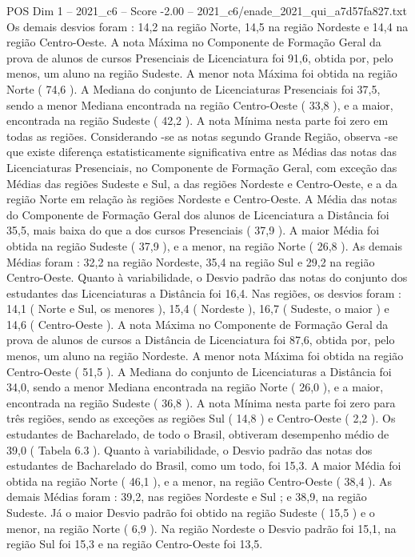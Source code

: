 \begin{textsample}{POS Dim 1 – 2021\_c6 – Score -2.00 – 2021\_c6/enade\_2021\_qui\_a7d57fa827.txt}
Os demais desvios foram : 14,2 na região Norte, 14,5 na região Nordeste e 14,4 na região Centro-Oeste.
A nota Máxima no Componente de Formação Geral da prova de alunos de cursos Presenciais de Licenciatura foi 91,6, obtida por, pelo menos, um aluno na região Sudeste.
A menor nota Máxima foi obtida na região Norte ( 74,6 ).
A Mediana do conjunto de Licenciaturas Presenciais foi 37,5, sendo a menor Mediana encontrada na região Centro-Oeste ( 33,8 ), e a maior, encontrada na região Sudeste ( 42,2 ).
A nota Mínima nesta parte foi zero em todas as regiões.
Considerando -se as notas segundo Grande Região, observa -se que existe diferença estatisticamente significativa entre as Médias das notas das Licenciaturas Presenciais, no Componente de Formação Geral, com exceção das Médias das regiões Sudeste e Sul, a das regiões Nordeste e Centro-Oeste, e a da região Norte em relação às regiões Nordeste e Centro-Oeste.
A Média das notas do Componente de Formação Geral dos alunos de Licenciatura a Distância foi 35,5, mais baixa do que a dos cursos Presenciais ( 37,9 ).
A maior Média foi obtida na região Sudeste ( 37,9 ), e a menor, na região Norte ( 26,8 ).
As demais Médias foram : 32,2 na região Nordeste, 35,4 na região Sul e 29,2 na região Centro-Oeste.
Quanto à variabilidade, o Desvio padrão das notas do conjunto dos estudantes das Licenciaturas a Distância foi 16,4.
Nas regiões, os desvios foram : 14,1 ( Norte e Sul, os menores ), 15,4 ( Nordeste ), 16,7 ( Sudeste, o maior ) e 14,6 ( Centro-Oeste ).
A nota Máxima no Componente de Formação Geral da prova de alunos de cursos a Distância de Licenciatura foi 87,6, obtida por, pelo menos, um aluno na região Nordeste.
A menor nota Máxima foi obtida na região Centro-Oeste ( 51,5 ).
A Mediana do conjunto de Licenciaturas a Distância foi 34,0, sendo a menor Mediana encontrada na região Norte ( 26,0 ), e a maior, encontrada na região Sudeste ( 36,8 ).
A nota Mínima nesta parte foi zero para três regiões, sendo as exceções as regiões Sul ( 14,8 ) e Centro-Oeste ( 2,2 ).
Os estudantes de Bacharelado, de todo o Brasil, obtiveram desempenho médio de 39,0 ( Tabela 6.3 ).
Quanto à variabilidade, o Desvio padrão das notas dos estudantes de Bacharelado do Brasil, como um todo, foi 15,3.
A maior Média foi obtida na região Norte ( 46,1 ), e a menor, na região Centro-Oeste ( 38,4 ).
As demais Médias foram : 39,2, nas regiões Nordeste e Sul ; e 38,9, na região Sudeste.
Já o maior Desvio padrão foi obtido na região Sudeste ( 15,5 ) e o menor, na região Norte ( 6,9 ).
Na região Nordeste o Desvio padrão foi 15,1, na região Sul foi 15,3 e na região Centro-Oeste foi 13,5.

\end{textsample}
